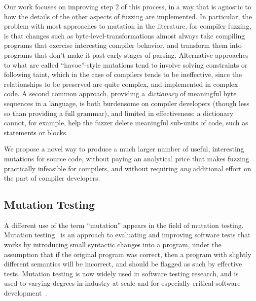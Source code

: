 Our work focuses on improving step 2 of this process, in a way that is agnostic to how the details of the other aspects of fuzzing are implemented.  In particular, the problem with most approaches to mutation in the literature, for compiler fuzzing, is that changes such as byte-level-transformations almost always take compiling programs that exercise interesting compiler behavior, and transform them into programs that don't make it past early stages of parsing.  Alternative approaches to what are called ``havoc''-style mutations tend to involve solving constraints or following taint, which in the case of compilers tends to be ineffective, since the relationships to be preserved are quite complex, and implemented in complex code.  A second common approach, providing a \emph{dictionary} of meaningful byte sequences in a language, is both burdensome on compiler developers (though less so than providing a full grammar), and limited in effectiveness: a dictionary cannot, for example, help the fuzzer delete meaningful sub-units of code, such as statements or blocks.

We propose a novel way to produce a much larger number of useful, interesting mutations for source code, without paying an analytical price that makes fuzzing practically infeasible for compilers, and without requiring \emph{any} additional effort on the part of compiler developers.

\subsection{Mutation Testing}

A different use of the term ``mutation'' appears in the field of mutation testing.  Mutation testing~\cite{MutationSurvey,budd1979mutation,demillo1978hints} is an approach to evaluating and improving software tests that works by introducing small syntactic changes into a program, under the assumption that if the original program was correct, then a program with slightly different semantics will be incorrect, and should be flagged as such by effective tests.  Mutation testing is now widely used in software testing research, and is used to varying degrees in industry at-scale and for especially critical software development~\cite{mutKernel,mutGoogle,mutFacebook}.

